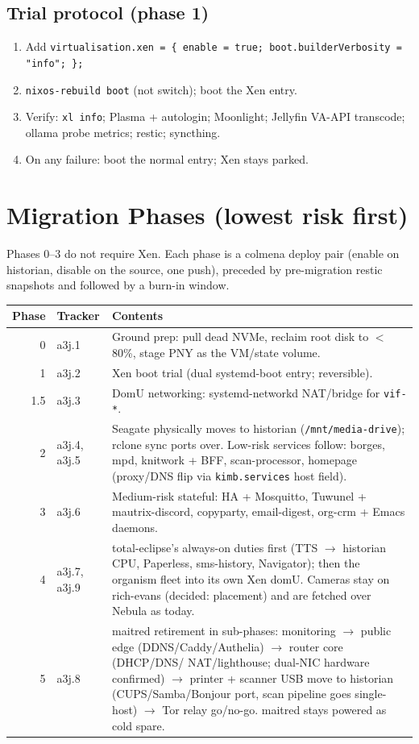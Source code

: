 \documentclass[11pt,letterpaper,headings=small]{scrartcl}
\begin{document}
\subsection{Trial protocol (phase 1)}

\begin{enumerate}
  \item Add \texttt{virtualisation.xen = \{ enable = true;
        boot.builderVerbosity = "info"; \};}
  \item \texttt{nixos-rebuild boot} (not switch); boot the Xen entry.
  \item Verify: \texttt{xl info}; Plasma + autologin; Moonlight;
        Jellyfin VA-API transcode; ollama probe metrics; restic;
        syncthing.
  \item On any failure: boot the normal entry; Xen stays parked.
\end{enumerate}

\section{Migration Phases (lowest risk first)}

Phases 0--3 do not require Xen. Each phase is a colmena deploy pair
(enable on historian, disable on the source, one push), preceded by
pre-migration restic snapshots and followed by a burn-in window.

\begin{center}
\small
\begin{tabular}{@{}rlp{4.0in}@{}}
\toprule
\textbf{Phase} & \textbf{Tracker} & \textbf{Contents} \\
\midrule
0 & a3j.1 & Ground prep: pull dead NVMe, reclaim root disk to
$<$80\%, stage PNY as the VM/state volume. \\
1 & a3j.2 & Xen boot trial (dual systemd-boot entry; reversible). \\
1.5 & a3j.3 & DomU networking: systemd-networkd NAT/bridge for
\texttt{vif-*}. \\
2 & a3j.4, a3j.5 & Seagate physically moves to historian
(\texttt{/mnt/media-drive}); rclone sync ports over. Low-risk services
follow: borges, mpd, knitwork + BFF, scan-processor, homepage
(proxy/DNS flip via \texttt{kimb.services} host field). \\
3 & a3j.6 & Medium-risk stateful: HA + Mosquitto, Tuwunel +
mautrix-discord, copyparty, email-digest, org-crm + Emacs daemons. \\
4 & a3j.7, a3j.9 & total-eclipse's always-on duties first (TTS
$\rightarrow$ historian CPU, Paperless, sms-history, Navigator); then
the organism fleet into its own Xen domU. Cameras stay on rich-evans
(decided: placement) and are fetched over Nebula as today. \\
5 & a3j.8 & maitred retirement in sub-phases: monitoring $\rightarrow$
public edge (DDNS/Caddy/Authelia) $\rightarrow$ router core (DHCP/DNS/
NAT/lighthouse; dual-NIC hardware confirmed) $\rightarrow$ printer +
scanner USB move to historian (CUPS/Samba/Bonjour port, scan pipeline
goes single-host) $\rightarrow$ Tor relay go/no-go. maitred stays powered
as cold spare. \\
\bottomrule
\end{tabular}
\end{center}
\end{document}
